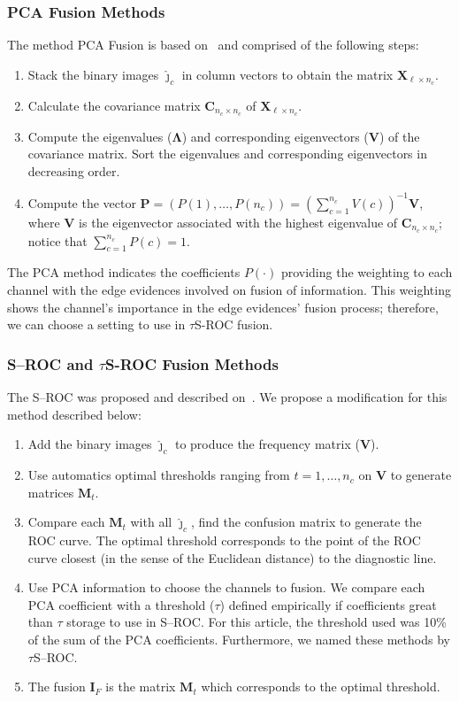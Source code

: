 \documentclass[remotesensing,article,submit,pdftex,moreauthors]{Definitions/mdpi}
\begin{document}
\subsubsection{PCA Fusion Methods}
The method PCA Fusion is based on~\cite{n_r,mit} and comprised of the following steps:
\begin{enumerate}[label=(\roman*)]
\item Stack the binary images $\bm{\widehat\jmath}_c$ in column vectors to obtain the matrix $\bm X_{\ell\times n_c}$.\label{item:PCA_1}
\item Calculate the covariance matrix $\bm C_{n_c\times n_c}$ of $\bm X_{\ell\times n_c}$.\label{item:PCA_2}
\item Compute the eigenvalues ($\bm\Lambda$) and corresponding eigenvectors ($\bm V$) of the covariance matrix. Sort the eigenvalues and corresponding eigenvectors in decreasing order. \label{item:PCA_3}
\item Compute the vector $\bm P=(P(1),\dots,P(n_c))=(\sum_{c=1}^{n_c} V(c))^{-1}{\bm V}$, where $\bm V$ is the eigenvector associated with the highest eigenvalue of $\bm C_{n_c\times n_c}$; notice that $\sum_{c=1}^{n_c} P(c)=1$. \label{item:PCA_4}
\end{enumerate}
 
The PCA method indicates the coefficients $P(\cdot)$ providing the weighting to each channel with the edge evidences involved on fusion of information. This weighting shows the channel's importance in the edge evidences' fusion process; therefore, we can choose a setting to use in $\tau$S-ROC fusion.
%
\subsubsection{S--ROC and \texorpdfstring{$\tau$S}--ROC Fusion Methods}
The S--ROC was proposed and described on~\cite{gs}. We propose a modification for this method described below:
\begin{enumerate}[label=(\roman*)]  
\item Add the binary images $\bm{\widehat\jmath}_c$ to produce the frequency matrix ($\bm V$).\label{item:eROC_1}
\item Use automatics optimal thresholds ranging from $t=1,\dots,n_c$ on $\bm V$ to generate matrices $\bm M_t$.\label{item:eROC_2}
\item Compare each $\bm M_t$ with all $\bm{\widehat\jmath}_c$, find the confusion matrix to generate the ROC curve. 
The optimal threshold corresponds to the point of the ROC curve closest (in the sense of the Euclidean distance) to the diagnostic line. \label{item:eROC_3}
\item Use PCA information to choose the channels to fusion. We compare each PCA coefficient with a threshold ($\tau$) defined empirically if coefficients great than $\tau$ storage to use in S--ROC. For this article, the threshold used was 10\% of the sum of the PCA coefficients. Furthermore, we named these methods by $\tau$S--ROC.    
\item The fusion $\bm I_F$ is the matrix $\bm M_t$ which corresponds to the optimal threshold.\label{item:eROC_4}
\end{enumerate}
%
\end{document}

